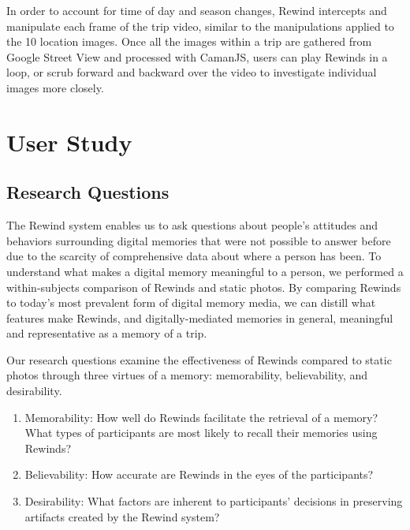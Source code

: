 \documentclass{sigchi}
\begin{document}
In order to account for time of day and season changes,
Rewind intercepts and manipulate each frame of the trip video, similar to the manipulations applied to the 10 location images. Once all the images within a trip are gathered from Google Street View and processed with CamanJS, users can play Rewinds in a loop, or scrub forward and backward over the video to investigate individual images more closely.

\section{User Study}
\subsection{Research Questions}
The Rewind system enables us to ask questions about people's attitudes and behaviors surrounding digital memories that were not possible to answer before due to the scarcity of comprehensive data about where a person has been. To understand what makes a digital memory meaningful to a person, we performed a within-subjects comparison of Rewinds and static photos. By comparing Rewinds to today's most prevalent form of digital memory media, we can distill what features make Rewinds, and digitally-mediated memories in general, meaningful and representative as a memory of a trip.

Our research questions examine the effectiveness of Rewinds compared to static photos through three virtues of a memory: memorability, believability, and desirability. %

\begin{enumerate}
\item Memorability: How well do Rewinds facilitate the retrieval of a memory? What types of participants are most likely to recall their memories using Rewinds?
\item Believability:  How accurate are Rewinds in the eyes of the participants? 
\item Desirability: What factors are inherent to participants' decisions in preserving artifacts created by the Rewind system?
\end{enumerate}
\end{document}
